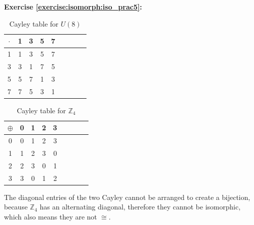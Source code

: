 \noindent\textbf{Exercise \ref{exercise:isomorph:iso_prac5}:}
\begin{multicols}{2}
\begin{table}[H]
\caption{Cayley table for $U(8)$}
{\small
\begin{center}
\begin{tabular}{c|cccccccc}
$\cdot$ & 1 & 3 & 5 & 7  \\
\hline
1        & 1 & 3 & 5 & 7  \\
3       & 3 & 1 & 7 & 5  \\
5       & 5 & 7 & 1 & 3 \\
7       & 7 & 5 & 3 & 1 \\
\end{tabular}
\end{center}
}
\end{table}

\begin{table}[H]
\caption{Cayley table for ${\mathbb Z}_4$}
{\small
\begin{center}
\begin{tabular}{c|cccccccc}
$\oplus$ & 0 & 1 & 2 & 3  \\
\hline
0        & 0 & 1 & 2 & 3  \\
1       & 1 & 2 & 3 & 0  \\
2       & 2 & 3 & 0 & 1 \\
3       & 3 & 0 & 1 & 2 \\
\end{tabular}
\end{center}
}
\end{table}

\end{multicols}
\noindent The diagonal entries of the two Cayley cannot be arranged to create a bijection, because ${\mathbb Z}_4$ has an alternating diagonal, therefore they cannot be isomorphic, which also means they are not $\cong$.
\\
\\

